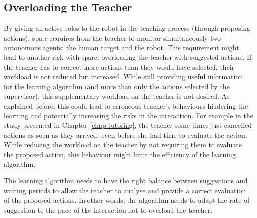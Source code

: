 \subsection{Overloading the Teacher}


By giving an active roles to the robot in the teaching process (through proposing actions), \gls{sparc} requires from the teacher to  monitor simultaneously two autonomous agents: the human target and the robot. This requirement might lead to another risk with \gls{sparc}: overloading the teacher with suggested actions. If the teacher has to correct more actions than they would have selected, their workload is not reduced but increased. While still providing useful information for the learning algorithm (and more than only the actions selected by the supervisor), this supplementary workload on the teacher is not desired. As explained before, this could lead to erroneous teacher's behaviours hindering the learning and potentially increasing the risks in the interaction. For example in the study presented in Chapter~\ref{chap:tutoring}, the teacher some times just cancelled actions as soon as they arrived, even before she had time to evaluate the action. While reducing the workload on the teacher by not requiring them to evaluate the proposed action, this behaviour might limit the efficiency of the learning algorithm. 

The learning algorithm needs to have the right balance between suggestions and waiting periods to allow the teacher to analyse and provide a correct evaluation of the proposed actions. In other words, the algorithm needs to adapt the rate of suggestion to the pace of the interaction not to overload the teacher.

